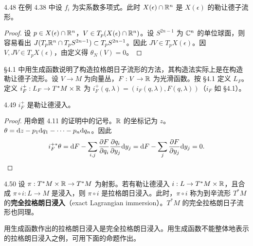 \begin{lemma*}{4.48}
  在例 4.38 中设 $f_i$ 为实系数多项式。此时 $X(\epsilon)\cap\mathbb{R}^n$ 是 $X(\epsilon)$ 的勒让德子流形。
\end{lemma*}
\begin{proof}
  设 $p\in X(\epsilon)\cap\mathbb{R}^n$，$V\in T_p(X(\epsilon)\cap\mathbb{R}^n)$。设 $S^{2n-1}$ 为 $\mathbb{C}^n$ 的单位球面，则容易看出 $J(T_p\mathbb{R}^n\cap T_pS^{2n-1})\subset T_pS^{2n-1}$。因此 $JV\in T_pX(\epsilon)$。因 $V,JV\in T_pX(\epsilon)$，由定义得 $\theta_N(V)=0$。
\end{proof}

§4.1 中用生成函数说明了构造拉格朗日子流形的方法，其构造法实际上是在构造勒让德子流形。设 $V\to M$ 为向量丛，$F:V\to\mathbb{R}$ 为光滑函数。按 §4.1 定义 $L_F$。定义 $i_F^+:L_F\to T^*M\times\mathbb{R}$ 为 $i_F^+(q,\lambda)=(i_F(q,\lambda),F(q,\lambda))$（$i_F$ 如 §4.1）。

\begin{proposition*}{4.49}
  $i_F^+$ 是勒让德浸入。
\end{proposition*}
\begin{proof}
  用命题 4.11 的证明中的记号。$\mathbb{R}$ 的坐标记为 $z$。$\theta=\mathrm{d} z-p_1\mathrm{d} q_1-\dots-p_n\mathrm{d} q_n$。因此
  \[
    i_F^{+*}\theta=\mathrm{d} F-\sum_{i,j}\frac{\partial F}{\partial q_i}\frac{\partial q_i}{\partial y_j}\mathrm{d} y_j=\mathrm{d} F-\sum_j\frac{\partial F}{\partial y_j}\mathrm{d} y_j=0.
  \]
\end{proof}

\begin{remark}{4.50}
  设 $\pi:T^*M\times\mathbb{R}\to T^*M$ 为射影。若有勒让德浸入 $i:L\to T^*M\times\mathbb{R}$，且合成 $\pi\circ i:L\to M$ 是浸入，则 $\pi\circ i$ 是拉格朗日浸入。此时，$\pi\circ i$ 称为到辛流形 $T^*M$ 的\textbf{完全拉格朗日浸入}（exact Lagrangian immersion）。$T^*M$ 的完全拉格朗日子流形也同理。
\end{remark}

用生成函数作出的拉格朗日浸入是完全拉格朗日浸入。用生成函数不能整体地表示的拉格朗日浸入之例，可用下面的命题作出。

